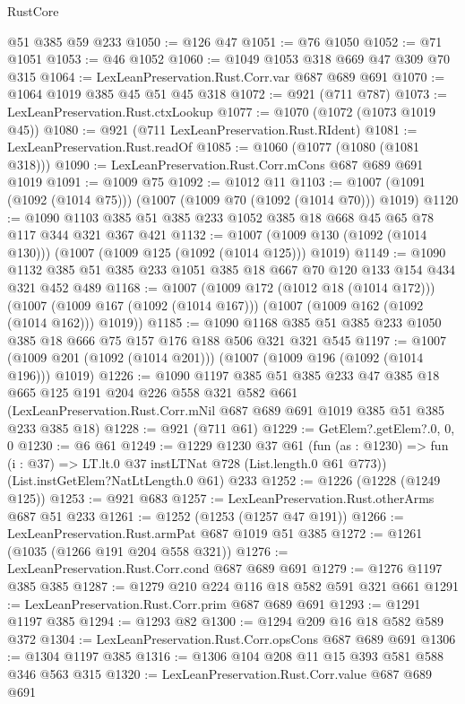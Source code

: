 \begin{lexlean}{RustCore}
\begin{coremodule}
    @51
    @385
    @59
    @233
@1050 := @126 @47
@1051 := @76 @1050
@1052 := @71 @1051
@1053 := @46 @1052
@1060 := @1049 @1053 @318 @669 @47 @309 @70 @315
@1064 := LexLeanPreservation.Rust.Corr.var @687 @689 @691
@1070 := @1064 @1019 @385 @45 @51 @45 @318
@1072 := @921 (@711 @787)
@1073 := LexLeanPreservation.Rust.ctxLookup
@1077 := @1070 (@1072 (@1073 @1019 @45))
@1080 := @921 (@711 LexLeanPreservation.Rust.RIdent)
@1081 := LexLeanPreservation.Rust.readOf
@1085 := @1060 (@1077 (@1080 (@1081 @318)))
@1090 := LexLeanPreservation.Rust.Corr.mCons @687 @689 @691 @1019
@1091 := @1009 @75
@1092 := @1012 @11
@1103 := @1007 (@1091 (@1092 (@1014 @75))) (@1007 (@1009 @70 (@1092 (@1014 @70))) @1019)
@1120 := @1090 @1103 @385 @51 @385 @233 @1052 @385 @18 @668 @45 @65 @78 @117 @344 @321 @367 @421
@1132 := @1007 (@1009 @130 (@1092 (@1014 @130))) (@1007 (@1009 @125 (@1092 (@1014 @125))) @1019)
@1149 := @1090 @1132 @385 @51 @385 @233 @1051 @385 @18 @667 @70 @120 @133 @154 @434 @321 @452 @489
@1168 := @1007
    (@1009 @172 (@1012 @18 (@1014 @172)))
    (@1007 (@1009 @167 (@1092 (@1014 @167))) (@1007 (@1009 @162 (@1092 (@1014 @162))) @1019))
@1185 := @1090 @1168 @385 @51 @385 @233 @1050 @385 @18 @666 @75 @157 @176 @188 @506 @321 @321 @545
@1197 := @1007 (@1009 @201 (@1092 (@1014 @201))) (@1007 (@1009 @196 (@1092 (@1014 @196))) @1019)
@1226 := @1090
    @1197
    @385
    @51
    @385
    @233
    @47
    @385
    @18
    @665
    @125
    @191
    @204
    @226
    @558
    @321
    @582
    @661
    (LexLeanPreservation.Rust.Corr.mNil @687 @689 @691 @1019 @385 @51 @385 @233 @385 @18)
@1228 := @921 (@711 @61)
@1229 := GetElem?.getElem?.{0, 0, 0}
@1230 := @6 @61
@1249 := @1229
    @1230
    @37
    @61
    (fun (as : @1230) => fun (i : @37) => LT.lt.{0} @37 instLTNat @728 (List.length.{0} @61 @773))
    (List.instGetElem?NatLtLength.{0} @61)
    @233
@1252 := @1226 (@1228 (@1249 @125))
@1253 := @921 @683
@1257 := LexLeanPreservation.Rust.otherArms @687 @51 @233
@1261 := @1252 (@1253 (@1257 @47 @191))
@1266 := LexLeanPreservation.Rust.armPat @687 @1019 @51 @385
@1272 := @1261 (@1035 (@1266 @191 @204 @558 @321))
@1276 := LexLeanPreservation.Rust.Corr.cond @687 @689 @691
@1279 := @1276 @1197 @385 @385
@1287 := @1279 @210 @224 @116 @18 @582 @591 @321 @661
@1291 := LexLeanPreservation.Rust.Corr.prim @687 @689 @691
@1293 := @1291 @1197 @385
@1294 := @1293 @82
@1300 := @1294 @209 @16 @18 @582 @589 @372
@1304 := LexLeanPreservation.Rust.Corr.opsCons @687 @689 @691
@1306 := @1304 @1197 @385
@1316 := @1306 @104 @208 @11 @15 @393 @581 @588 @346 @563 @315
@1320 := LexLeanPreservation.Rust.Corr.value @687 @689 @691

\end{coremodule}
\end{lexlean}
